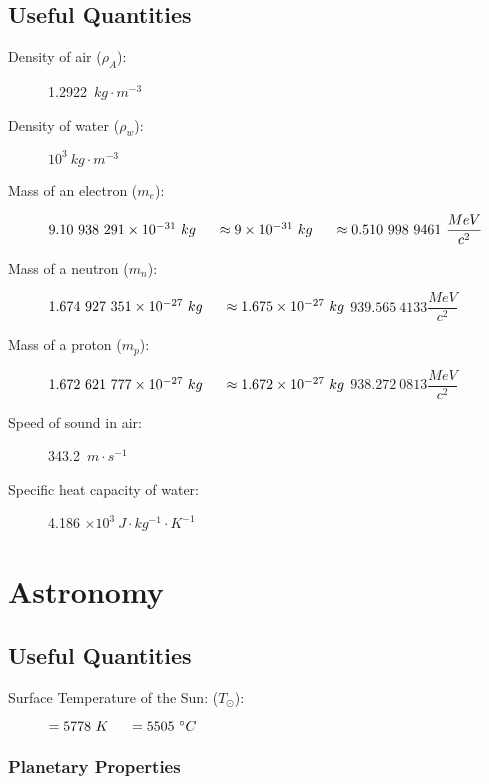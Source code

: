 \subsection{Useful Quantities}
\begin{description}			
\item[Density of air ($\rho_A$):] 1.2922\ $kg \cdot m^{-3}$				
\item[Density of water ($\rho_w$):] $10^3\ kg \cdot m^{-3}$				
\item[Mass of an electron ($m_e$):] $ 9.10\ 938\ 291 \times 10^{-31}\ kg \tab[0.5cm] \approx  9 \times 10^{-31}\ kg \tab[0.5cm] \approx 0.510\ 998\ 9461\ \dfrac{MeV}{c^2} $
\item[Mass of a neutron ($m_n$):] $1.674\ 927\ 351 \times 10^{-27}\ kg \tab[0.5cm]\approx  1.675 \times 10^{-27}\ kg$				
\subitem \( 939.565\ 4133 \dfrac{MeV}{c^2} \)
\item[Mass of a proton ($m_p$):] $1.672\ 621\ 777 \times 10^{-27}\ kg \tab[0.5cm] \approx  1.672 \times 10^{-27}\ kg$					
\subitem \( 938.272\ 0813 \dfrac{MeV}{c^2} \)
\item[Speed of sound in air:] 343.2\ $m\cdot s^{-1}$				
\item[Specific heat capacity of water:] 4.186 $\times 10^3\ J \cdot kg^{-1} \cdot K^{-1}$
\end{description}



\section{Astronomy}


\subsection{Useful Quantities}
\begin{description}			

\item[Surface Temperature of the Sun: ($T_\odot$):] $= 5778\ K\tab[0.5cm]= 5505\ \degrees C$                   
\end{description}

\subsubsection{Planetary Properties}

